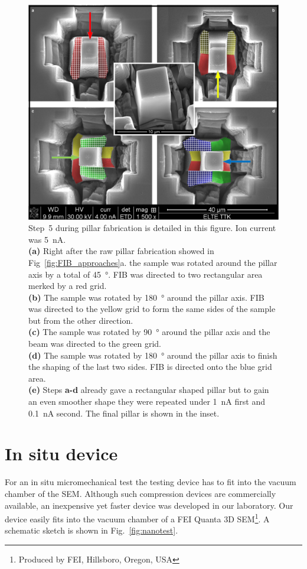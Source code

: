 \begin{figure}[htbp!] 
\centering    
\includegraphics[width=1\textwidth]{Micron-Scale_Deformation}
\caption[Final pillar fabrication details]{Step~5 during pillar fabrication is detailed in this figure. Ion current was \SI{5}{nA}.\\
\textbf{(a)} Right after the raw pillar fabrication showed in Fig~\ref{fig:FIB_approaches}a. the sample was rotated around the pillar axis by a total of \SI{45}{\degree}. FIB was directed to two rectangular area merked by a red grid.\\
\textbf{(b)} The sample was rotated by \SI{180}{\degree} around the pillar axis. FIB was directed to the yellow grid to form the same sides of the sample but from the other direction.\\
\textbf{(c)} The sample was rotated by \SI{90}{\degree} around the pillar axis and the beam was directed to the green grid.\\
\textbf{(d)} The sample was rotated by \SI{180}{\degree} around the pillar axis to finish the shaping of the last two sides. FIB is directed onto the blue grid area.\\
\textbf{(e)} Steps \textbf{a-d} already gave a rectangular shaped pillar but to gain an even smoother shape they were repeated under \SI{1}{nA} first and \SI{0.1}{nA} second. The final pillar is shown in the inset.}
\label{fig:FIB_sides}
\end{figure}


\section{In situ device}
For an in situ micromechanical test the testing device has to fit into the vacuum chamber of the SEM. Although such compression devices are commercially available, an inexpensive yet faster device was developed in our laboratory. Our device easily fits into the vacuum chamber of a FEI Quanta 3D SEM\footnote{Produced by FEI, Hillsboro, Oregon, USA}. A schematic sketch is shown in Fig.~\ref{fig:nanotest}.

